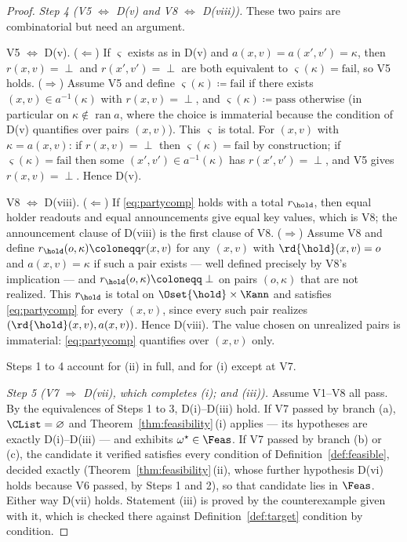 \begin{proof}
\emph{Step 4 (V5 $\Leftrightarrow$ D(v) and V8 $\Leftrightarrow$ D(viii)).}
These two pairs are combinatorial but need an argument.

V5 $\Leftrightarrow$ D(v). ($\Leftarrow$) If $\varsigma$ exists as in
D(v) and $a(x,v)=a(x',v')=\kappa$, then $r(x,v)=\perp$ and $r(x',v')=\perp$ are
both equivalent to $\varsigma(\kappa)=\mathrm{fail}$, so V5 holds.
($\Rightarrow$) Assume V5 and define
$\varsigma(\kappa)\coloneqq\mathrm{fail}$ if there exists
$(x,v)\in a^{-1}(\kappa)$ with $r(x,v)=\perp$, and
$\varsigma(\kappa)\coloneqq\mathrm{pass}$ otherwise (in particular on
$\kappa\notin\operatorname{ran}a$, where the choice is immaterial because the
condition of D(v) quantifies over pairs $(x,v)$). This $\varsigma$ is total.
For $(x,v)$ with $\kappa=a(x,v)$: if $r(x,v)=\perp$ then
$\varsigma(\kappa)=\mathrm{fail}$ by construction; if
$\varsigma(\kappa)=\mathrm{fail}$ then some $(x',v')\in a^{-1}(\kappa)$ has
$r(x',v')=\perp$, and V5 gives $r(x,v)=\perp$. Hence D(v).

V8 $\Leftrightarrow$ D(viii). ($\Leftarrow$) If \eqref{eq:partycomp}
holds with a total $r_{\hold}$, then equal holder readouts and equal
announcements give equal key values, which is V8; the announcement clause of
D(viii) is the first clause of V8. ($\Rightarrow$) Assume V8 and define
$r_{\hold}(o,\kappa)\coloneqq r(x,v)$ for any $(x,v)$ with
$\rd{\hold}(x,v)=o$ and $a(x,v)=\kappa$ if such a pair exists --- well defined
precisely by V8's implication --- and $r_{\hold}(o,\kappa)\coloneqq\perp$ on
pairs $(o,\kappa)$ that are not realized. This $r_{\hold}$ is total on
$\Oset{\hold}\times\Kann$ and satisfies \eqref{eq:partycomp} for every $(x,v)$,
since every such pair realizes $(\rd{\hold}(x,v),a(x,v))$. Hence D(viii). The
value chosen on unrealized pairs is immaterial: \eqref{eq:partycomp} quantifies
over $(x,v)$ only.

Steps 1 to 4 account for (ii) in full, and for (i) except at V7.

\emph{Step 5 (V7 $\Rightarrow$ D(vii), which completes (i); and (iii)).}
Assume V1--V8 all pass. By the equivalences of Steps 1 to 3, D(i)--D(iii)
hold. If V7 passed by branch (a), $\CList=\varnothing$ and
Theorem~\ref{thm:feasibility}\,(i) applies --- its hypotheses are exactly
D(i)--D(iii) --- and exhibits $\omega^{\star}\in\Feas$. If V7 passed by
branch (b) or (c), the candidate it verified satisfies every condition of
Definition~\ref{def:feasible}, decided exactly (Theorem~\ref{thm:feasibility}\,(ii),
whose further hypothesis D(vi) holds because V6 passed, by Steps 1 and 2),
so that candidate lies in $\Feas$. Either way D(vii) holds. Statement (iii) is
proved by the counterexample given with it, which is checked there against
Definition~\ref{def:target} condition by condition.


\end{proof}

